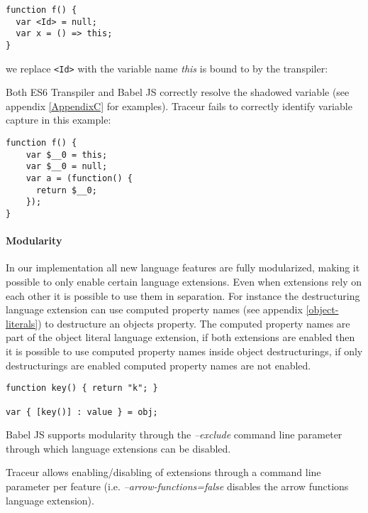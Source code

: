 \begin{lstlisting}[label=traceur-capture, caption=Example input to Traceur\protect\footnotemark]
function f() {
  var <Id> = null;
  var x = () => this; 
}
\end{lstlisting}

we replace \lstinline$<Id>$ with the variable name \textit{this} is bound to by the transpiler:

Both ES6 Transpiler and Babel JS correctly resolve the shadowed variable (see appendix \ref{AppendixC} for examples). Traceur fails to correctly identify variable capture in this example:

\begin{lstlisting}[caption=Variable capture in Traceur transpiler]
function f() {
    var $__0 = this;
    var $__0 = null;
    var a = (function() {
      return $__0;
	});
}
\end{lstlisting}

\paragraph{Modularity}

In our implementation all new language features are fully modularized, making it possible to only enable certain language extensions. Even when extensions rely on each other it is possible to use them in separation. For instance the destructuring language extension can use computed property names (see appendix \ref{object-literals}) to destructure an objects property. The computed property names are part of the object literal language extension, if both extensions are enabled then it is possible to use computed property names inside object destructurings, if only destructurings are enabled computed property names are not enabled.

\begin{lstlisting}[caption=Example of computed property names inside object destructurings]
function key() { return "k"; }

var { [key()] : value } = obj;
\end{lstlisting}

Babel JS supports modularity through the \textit{--exclude} command line parameter through which language extensions can be disabled.

Traceur allows enabling/disabling of extensions through a command line parameter per feature (i.e. \textit{--arrow-functions=false} disables the arrow functions language extension).

